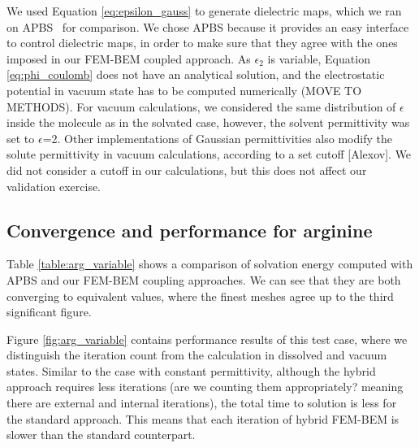 We used Equation \eqref{eq:epsilon_gauss} to generate dielectric maps, which we ran on APBS~\cite{BakerETal2001} for comparison. 
We chose APBS because it provides an easy interface to control dielectric maps, in order to make sure that they agree with the ones imposed in our FEM-BEM coupled approach.
As $\epsilon_2$ is variable, Equation \eqref{eq:phi_coulomb} does not have an analytical solution, and the electrostatic potential in vacuum state has to be computed numerically (MOVE TO METHODS).
For vacuum calculations, we considered the same distribution of $\epsilon$ inside the molecule as in the solvated case, however, the solvent permittivity was set to $\epsilon$=2. 
Other implementations of Gaussian permittivities also modify the solute permittivity in vacuum calculations, according to a set cutoff [Alexov]. 
We did not consider a cutoff in our calculations, but this does not affect our validation exercise. 

\subsection*{\sffamily \large Convergence and performance for arginine}

Table \ref{table:arg_variable} shows a comparison of solvation energy computed with APBS and our FEM-BEM coupling approaches. We can see that they are both converging to equivalent values, where the finest meshes agree up to the third significant figure.

Figure \ref{fig:arg_variable} contains performance results of this test case, where we distinguish the iteration count from the calculation in dissolved and vacuum states. 
Similar to the case with constant permittivity, although the hybrid approach requires less iterations (are we counting them appropriately? meaning there are external and internal iterations), the total time to solution is less for the standard approach. This means that each iteration of hybrid FEM-BEM is slower than the standard counterpart.


